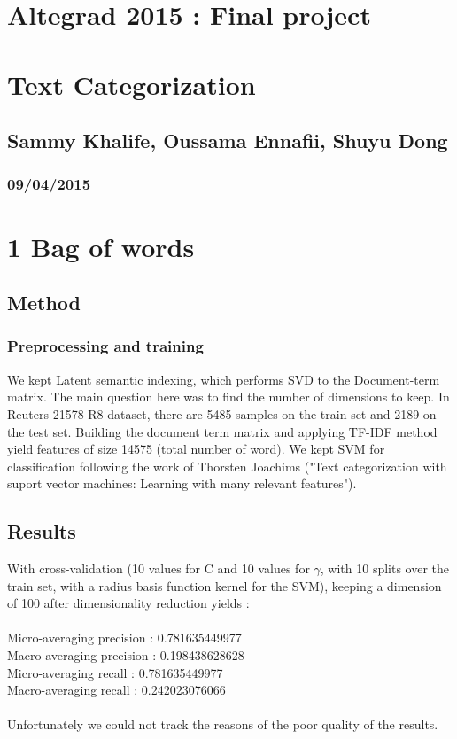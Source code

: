 
\geometry{hmargin=2.5cm,vmargin=2cm}   


\begin{center}

\section*{Altegrad 2015 : Final project}
\section*{Text Categorization}
\subsection*{Sammy Khalife, Oussama Ennafii, Shuyu Dong}
\subsubsection*{09/04/2015}

\end{center}

\section*{1 Bag of words}
\subsection*{Method}
\subsubsection*{Preprocessing and training}
We kept Latent semantic indexing, which performs SVD to the Document-term matrix.
The main question here was to find the number of dimensions to keep. In Reuters-21578 R8 dataset, there are 5485 samples on the train set and 2189 on the test set. Building the document term matrix and applying TF-IDF method yield features of size 14575 (total number of word). 
We kept SVM for classification following the work of Thorsten Joachims ("Text categorization with suport vector machines: Learning with many relevant features").
\subsection*{Results}
With cross-validation (10 values for C and 10 values for $\gamma$, with 10 splits over the train set, with a radius basis function kernel for the SVM), keeping a dimension of 100 after dimensionality reduction yields :~\\
~\\
Micro-averaging precision : 0.781635449977~\\
Macro-averaging precision : 0.198438628628~\\
Micro-averaging recall : 0.781635449977~\\
Macro-averaging recall : 0.242023076066~\\
~\\
Unfortunately we could not track the reasons of the poor quality of the results.
